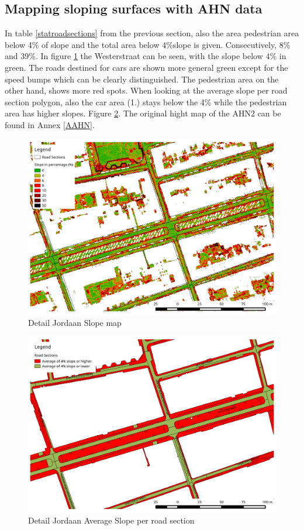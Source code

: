 \subsection{Mapping sloping surfaces with AHN data}
In table \ref{statroadsections} from the previous section, also the area pedestrian area below 4\% of slope and the total area below 4\%slope is given. Consecutively, 8\% and 39\%.
In figure \ref{jordaanslope} the Westerstraat can be seen, with the slope below 4\% in green. The roads destined for cars are shown more general green except for the speed bumps which can be clearly distinguished. The pedestrian area on the other hand, shows more red spots. When looking at the average slope per road section polygon, also the car area (1.) stays below the 4\% while the pedestrian area has higher slopes. Figure \ref{jordaanroadslope}.
The original hight map of the AHN2 can be found in Annex \ref{AAHN}.
\begin{figure}[h]
\includegraphics[width=\textwidth]{img/R_slope_jordaan.pdf}
\centering
\caption{
Detail Jordaan Slope map\label{jordaanslope}}
\end{figure} 

\begin{figure}[h]
\includegraphics[width=\textwidth]{img/R_averageslope_jordaan_roadsection.pdf}
\centering
\caption{
Detail Jordaan Average Slope per road section\label{jordaanroadslope}}
\end{figure} 
\clearpage



